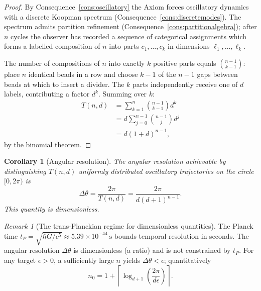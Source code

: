 \documentclass[11pt,twocolumn,a4paper]{article}
\theoremstyle{axiomstyle}
\theoremstyle{conseqstyle}
\newtheorem{corollary}{Corollary}
\theoremstyle{definition}
\theoremstyle{remark}
\newtheorem*{remark}{Remark}
\begin{document}
\begin{proof}
By Consequence~\ref{cons:oscillatory} the Axiom forces oscillatory dynamics with a discrete Koopman spectrum (Consequence~\ref{cons:discretemodes}). The spectrum admits partition refinement (Consequence~\ref{cons:partitionalgebra}); after $n$ cycles the observer has recorded a sequence of categorical assignments which forms a labelled composition of $n$ into parts $c_{1},\ldots,c_{k}$ in dimensions $\ell_{1},\ldots,\ell_{k}$.

The number of compositions of $n$ into exactly $k$ positive parts equals $\binom{n-1}{k-1}$: place $n$ identical beads in a row and choose $k-1$ of the $n-1$ gaps between beads at which to insert a divider. The $k$ parts independently receive one of $d$ labels, contributing a factor $d^{k}$. Summing over $k$:
\begin{align}
T(n,d) &= \sum_{k=1}^{n}\binom{n-1}{k-1}d^{k}\\
&= d\sum_{j=0}^{n-1}\binom{n-1}{j}d^{j}\\
&= d(1+d)^{n-1},
\end{align}
by the binomial theorem.
\end{proof}

\begin{corollary}[Angular resolution]\label{cor:angularresolution}
The angular resolution achievable by distinguishing $T(n,d)$ uniformly distributed oscillatory trajectories on the circle $[0,2\pi)$ is
\begin{equation}
\Delta\theta=\frac{2\pi}{T(n,d)}=\frac{2\pi}{d(d+1)^{n-1}}.
\end{equation}
This quantity is dimensionless.
\end{corollary}

\begin{remark}[The trans-Planckian regime for dimensionless quantities]
The Planck time $t_{P}=\sqrt{\hbar G/c^{5}}\approx 5.39\times10^{-44}~\mathrm{s}$ bounds temporal resolution in seconds. The angular resolution $\Delta\theta$ is dimensionless (a ratio) and is not constrained by $t_{P}$. For any target $\epsilon>0$, a sufficiently large $n$ yields $\Delta\theta<\epsilon$; quantitatively
\begin{equation}
n_{0}=1+\left\lceil\log_{d+1}\!\left(\frac{2\pi}{d\epsilon}\right)\right\rceil.
\end{equation}
\end{remark}
\end{document}
